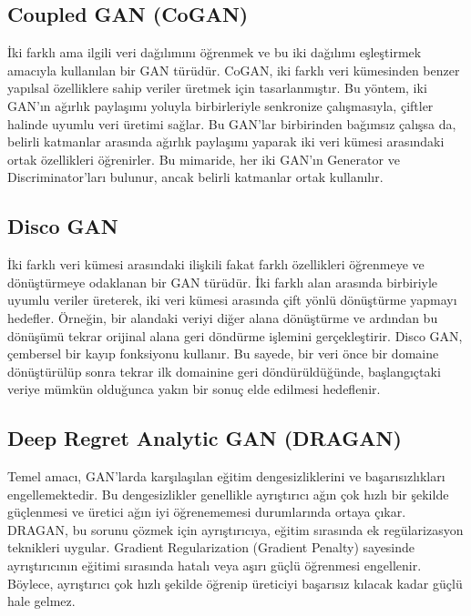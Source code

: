 \subsection{Coupled GAN (CoGAN)}

İki farklı ama ilgili veri dağılımını öğrenmek ve bu iki dağılımı eşleştirmek amacıyla kullanılan bir GAN türüdür. CoGAN, iki farklı veri kümesinden benzer yapılsal özelliklere sahip veriler üretmek için tasarlanmıştır. Bu yöntem, iki GAN'ın ağırlık paylaşımı yoluyla birbirleriyle senkronize çalışmasıyla, çiftler halinde uyumlu veri üretimi sağlar. Bu GAN'lar birbirinden bağımsız çalışsa da, belirli katmanlar arasında ağırlık paylaşımı yaparak iki veri kümesi arasındaki ortak özellikleri öğrenirler. Bu mimaride, her iki GAN'ın Generator ve Discriminator'ları bulunur, ancak belirli katmanlar ortak kullanılır. 

\subsection{Disco GAN}

İki farklı veri kümesi arasındaki ilişkili fakat farklı özellikleri öğrenmeye ve dönüştürmeye odaklanan bir GAN türüdür. İki farklı alan arasında birbiriyle uyumlu veriler üreterek, iki veri kümesi arasında çift yönlü dönüştürme yapmayı hedefler. Örneğin, bir alandaki veriyi diğer alana dönüştürme ve ardından bu dönüşümü tekrar orijinal alana geri döndürme işlemini gerçekleştirir. Disco GAN, çembersel bir kayıp fonksiyonu kullanır. Bu sayede, bir veri önce bir domaine dönüştürülüp sonra tekrar ilk domainine geri döndürüldüğünde, başlangıçtaki veriye mümkün olduğunca yakın bir sonuç elde edilmesi hedeflenir.

\subsection{Deep Regret Analytic GAN (DRAGAN)}

Temel amacı, GAN'larda karşılaşılan eğitim dengesizliklerini ve başarısızlıkları engellemektedir. Bu dengesizlikler genellikle ayrıştırıcı ağın çok hızlı bir şekilde güçlenmesi ve üretici ağın iyi öğrenememesi durumlarında ortaya çıkar. DRAGAN, bu sorunu çözmek için ayrıştırıcıya, eğitim sırasında ek regülarizasyon teknikleri uygular.  Gradient Regularization (Gradient Penalty) sayesinde ayrıştırıcının eğitimi sırasında hatalı veya aşırı güçlü öğrenmesi engellenir. Böylece, ayrıştırıcı çok hızlı şekilde öğrenip üreticiyi başarısız kılacak kadar güçlü hale gelmez. 

